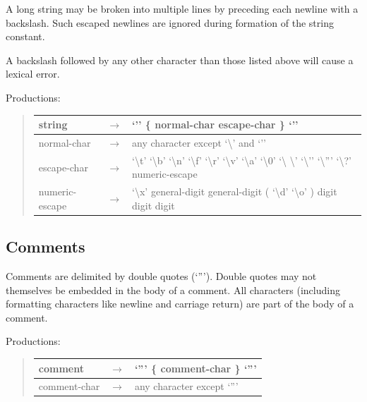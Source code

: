 \documentclass[letterpaper,10pt,english]{sphinxmanual}
\begin{document}
A long string may be broken into multiple lines by preceding each newline with a backslash. Such
escaped newlines are ignored during formation of the string constant.

A backslash followed by any other character than those listed above will cause a lexical error.

Productions:
\begin{quote}

\begin{tabulary}{\linewidth}{|L|L|L|}
\hline

string
 & 
\(\rightarrow\)
 & 
‘’’ \{ normal-char \textbar{} escape-char \} ‘’’
\\\hline

normal-char
 & 
\(\rightarrow\)
 & 
any character except ‘\textbackslash{}’ and ‘’’
\\\hline

escape-char
 & 
\(\rightarrow\)
 & 
‘\textbackslash{}t’ \textbar{} ‘\textbackslash{}b’ \textbar{} ‘\textbackslash{}n’ \textbar{} ‘\textbackslash{}f’ \textbar{} ‘\textbackslash{}r’ \textbar{} ‘\textbackslash{}v’ \textbar{} ‘\textbackslash{}a’ \textbar{} ‘\textbackslash{}0’ \textbar{} ‘\textbackslash{} \textbackslash{}’ \textbar{} ‘\textbackslash{}’’ \textbar{} ‘\textbackslash{}''’ \textbar{} ‘\textbackslash{}?’ \textbar{} numeric-escape
\\\hline

numeric-escape
 & 
\(\rightarrow\)
 & 
‘\textbackslash{}x’ general-digit general-digit \textbar{} ( ‘\textbackslash{}d’ \textbar{} ‘\textbackslash{}o’ ) digit digit digit
\\\hline
\end{tabulary}

\end{quote}


\subsection{Comments}
\label{langref:comments}
Comments are delimited by double quotes (‘''’). Double quotes may not themselves be embedded
in the body of a comment. All characters (including formatting characters like newline and carriage
return) are part of the body of a comment.

Productions:
\begin{quote}

\begin{tabulary}{\linewidth}{|L|L|L|}
\hline

comment
 & 
\(\rightarrow\)
 & 
‘''’ \{ comment-char \} ‘''’
\\\hline

comment-char
 & 
\(\rightarrow\)
 & 
any character except ‘''’
\\\hline
\end{tabulary}

\end{quote}
\end{document}
